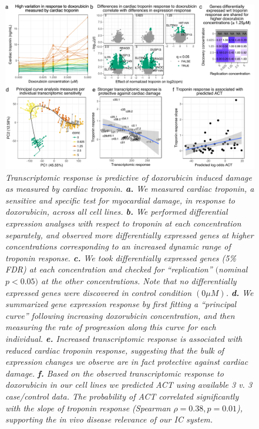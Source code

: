 \documentclass{article}
\begin{document}
\begin{figure}
\begin{center}
    \includegraphics[width=1\textwidth]{../figures/fig4_troponin.pdf}     \caption{\it{Transcriptomic response is predictive of doxorubicin induced damage as measured by cardiac troponin. \textbf{a.} We measured cardiac troponin, a sensitive and specific test for myocardial damage, in response to doxorubicin, across all cell lines. \textbf{b.} We performed differential expression analyses with respect to troponin at each concentration separately, and observed more differentially expressed genes at higher concentrations corresponding to an increased dynamic range of troponin response. \textbf{c.} We took differentially expressed genes (5\% FDR) at each concentration and checked for ``replication'' $($nominal $p<0.05)$ at the other concentrations. Note that no differentially expressed genes were discovered in control condition $(0 \mu M)$. \textbf{d.} We summarized gene expression response by first fitting a ``principal curve'' following increasing doxorubicin concentration, and then measuring the rate of progression along this curve for each individual. \textbf{e.} Increased transcriptomic response is associated with reduced cardiac troponin response, suggesting that the bulk of expression changes we observe are in fact protective against cardiac damage. \textbf{f.} Based on the observed transcriptomic response to doxorubicin in our cell lines we predicted ACT using available 3 v. 3 case/control data\cite{Burridge2016}. The probability of ACT correlated significantly with the slope of troponin response (Spearman $\rho=0.38, p=0.01$), supporting the \emph{in vivo} disease relevance of our IC system. }}
    \label{fig_troponin}
    \end{center}
\end{figure}
\end{document}
